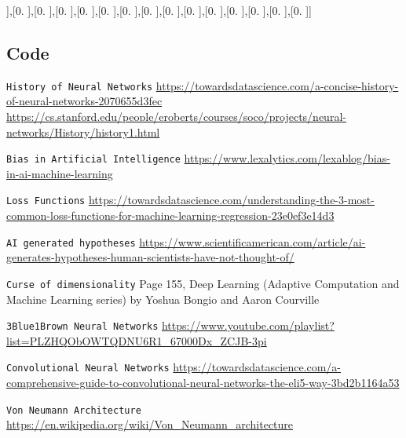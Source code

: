 \documentclass[titlepage]{article}
\begin{document}
     ],[0.        ],[0.        ],[0.        ],[0.        ],[0.        ],[0.        ],[0.        ],[0.        ],[0.        ],[0.        ],[0.        ],[0.        ],[0.        ],[0.        ]]

\subsection{Code}


\begin{thebibliography}{9}
    \texttt{History of Neural Networks}
    \url{https://towardsdatascience.com/a-concise-history-of-neural-networks-2070655d3fec}
    \url{https://cs.stanford.edu/people/eroberts/courses/soco/projects/neural-networks/History/history1.html}
   
    \texttt{Bias in Artificial Intelligence}
    \url{https://www.lexalytics.com/lexablog/bias-in-ai-machine-learning}

    \texttt{Loss Functions}
    \url{https://towardsdatascience.com/understanding-the-3-most-common-loss-functions-for-machine-learning-regression-23e0ef3e14d3}

    \texttt{AI generated hypotheses}
    \url{https://www.scientificamerican.com/article/ai-generates-hypotheses-human-scientists-have-not-thought-of/}

    \texttt{Curse of dimensionality}
    Page 155, Deep Learning (Adaptive Computation and Machine Learning series) by Yoshua Bongio and Aaron Courville

    \texttt{3Blue1Brown Neural Networks}
    \url{https://www.youtube.com/playlist?list=PLZHQObOWTQDNU6R1_67000Dx_ZCJB-3pi}

    \texttt{Convolutional Neural Networks}
    \url{https://towardsdatascience.com/a-comprehensive-guide-to-convolutional-neural-networks-the-eli5-way-3bd2b1164a53}

    \texttt{Von Neumann Architecture}
    \url{https://en.wikipedia.org/wiki/Von_Neumann_architecture}
\end{thebibliography}
\end{document}
